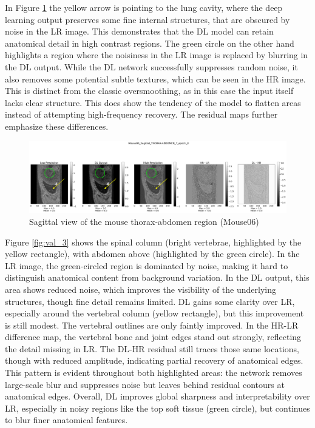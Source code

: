 \documentclass[twocolumn]{article}
\begin{document}
In Figure \ref{fig:val_2} the yellow arrow is pointing to the lung cavity, where the deep learning output preserves some fine internal structures,
that are obscured by noise in the LR image. This demonstrates that the DL model can retain anatomical detail in high contrast regions. 
The green circle on the other hand highlights a region where the noisiness in the LR image is replaced by blurring in the DL output. 
While the DL network successfully suppresses random noise, it also removes some potential subtle textures, which can be seen in the HR image. 
This is distinct from the classic oversmoothing, as in this case the input itself lacks clear structure. 
This does show the tendency of the model to flatten areas instead of attempting high-frequency recovery.
The residual maps further emphasize these differences.

\begin{figure}
    \centering
    \includegraphics[width=1\linewidth]{Mouse06_Sagittal_val.png}
    \caption{Sagittal view of the mouse thorax-abdomen region (Mouse06)}
    \label{fig:val_2}
\end{figure}

Figure \ref{fig:val_3} shows the spinal column (bright vertebrae, highlighted by the yellow rectangle), with abdomen  above (highlighted by the green circle). 
In the LR image, the green-circled region is dominated by noise, making it hard to distinguish anatomical content from background variation. 
In the DL output, this area shows reduced noise, which improves the visibility of the underlying structures, though fine detail remains limited. 
DL gains some clarity over LR, especially around the vertebral column (yellow rectangle), but this improvement is still modest. 
The vertebral outlines are only faintly improved. In the HR-LR difference map, the vertebral bone and joint edges stand out strongly, reflecting the detail missing in LR. 
The DL-HR residual still traces those same locations, though with reduced amplitude, indicating partial recovery of anatomical edges. 
This pattern is evident throughout both highlighted areas: the network removes large-scale blur and suppresses noise but leaves behind residual contours at anatomical edges. 
Overall, DL improves global sharpness and interpretability over LR, especially in noisy regions like the top soft tissue (green circle), but continues to blur finer anatomical features.
\end{document}
